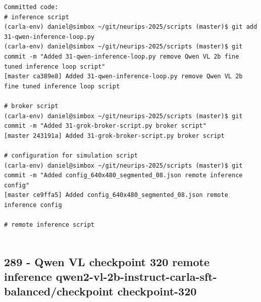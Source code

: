 \begin{verbatim}
Committed code:
# inference script
(carla-env) daniel@simbox ~/git/neurips-2025/scripts (master)$ git add 31-qwen-inference-loop.py 
(carla-env) daniel@simbox ~/git/neurips-2025/scripts (master)$ git commit -m "Added 31-qwen-inference-loop.py remove Qwen VL 2b fine tuned inference loop script"
[master ca389e8] Added 31-qwen-inference-loop.py remove Qwen VL 2b fine tuned inference loop script

# broker script
(carla-env) daniel@simbox ~/git/neurips-2025/scripts (master)$ git commit -m "Added 31-grok-broker-script.py broker script"
[master 243191a] Added 31-grok-broker-script.py broker script

# configuration for simulation script
(carla-env) daniel@simbox ~/git/neurips-2025/scripts (master)$ git commit -m "Added config_640x480_segmented_08.json remote inference config"
[master ce9ffa5] Added config_640x480_segmented_08.json remote inference config

# remote inference script


\end{verbatim}

\subsection{289 - Qwen VL checkpoint 320 remote inference qwen2-vl-2b-instruct-carla-sft-balanced/checkpoint checkpoint-320}
\label{app_res:289}

